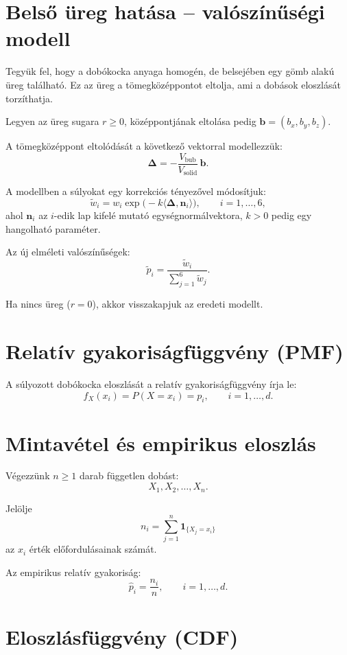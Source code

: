 \documentclass[a4paper,12pt]{article}
\begin{document}
\section{Belső üreg hatása – valószínűségi modell}

Tegyük fel, hogy a dobókocka anyaga homogén, de belsejében egy gömb alakú
üreg található.
Ez az üreg a tömegközéppontot eltolja, ami a dobások eloszlását
torzíthatja.

Legyen az üreg sugara $r \ge 0$, középpontjának eltolása pedig
$\mathbf b = (b_x,b_y,b_z)$.

A tömegközéppont eltolódását a következő vektorral modellezzük:
\[
\mathbf\Delta
=
-\frac{V_{\mathrm{bub}}}{V_{\mathrm{solid}}}\,\mathbf b.
\]

A modellben a súlyokat egy korrekciós tényezővel módosítjuk:
\[
\widetilde w_i
=
w_i \exp\!\bigl(-k \langle \mathbf\Delta, \mathbf n_i\rangle\bigr),
\qquad i=1,\dots,6,
\]
ahol $\mathbf n_i$ az $i$-edik lap kifelé mutató egységnormálvektora,
$k>0$ pedig egy hangolható paraméter.

Az új elméleti valószínűségek:
\[
\widetilde p_i
=
\frac{\widetilde w_i}{\sum_{j=1}^{6} \widetilde w_j}.
\]

Ha nincs üreg ($r=0$), akkor visszakapjuk az eredeti modellt.

\section{Relatív gyakoriságfüggvény (PMF)}

A súlyozott dobókocka eloszlását a relatív gyakoriságfüggvény írja le:
\[
f_X(x_i) = P(X=x_i) = p_i,
\qquad i=1,\dots,d.
\]

\section{Mintavétel és empirikus eloszlás}

Végezzünk $n\ge1$ darab független dobást:
\[
X_1,X_2,\dots,X_n.
\]

Jelölje
\[
n_i = \sum_{j=1}^{n} \mathbf 1_{\{X_j=x_i\}}
\]
az $x_i$ érték előfordulásainak számát.

Az empirikus relatív gyakoriság:
\[
\hat p_i = \frac{n_i}{n},
\qquad i=1,\dots,d.
\]

\section{Eloszlásfüggvény (CDF)}
\end{document}
